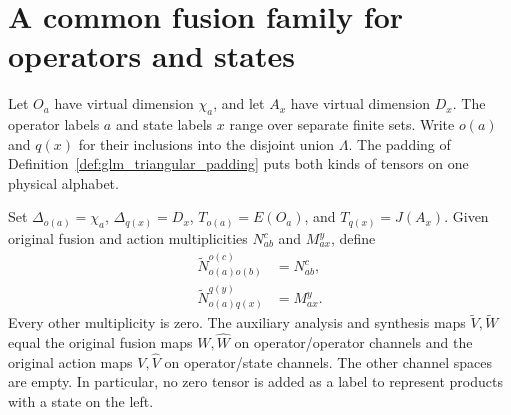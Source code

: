 
\section{A common fusion family for operators and states}
\label{sec:glm_triangular_boundary}

Let $O_a$ have virtual dimension $\chi_a$, and let $A_x$ have virtual
dimension $D_x$. The operator labels $a$ and state labels $x$ range over
separate finite sets. Write $o(a)$ and $q(x)$ for their inclusions into the
disjoint union $\Lambda$. The padding of
Definition~\ref{def:glm_triangular_padding} puts both kinds of tensors on
one physical alphabet.

\begin{definition}
    \leanok
    \label{def:glm_triangular_boundary_family}
    Set $\Delta_{o(a)}=\chi_a$, $\Delta_{q(x)}=D_x$,
    $T_{o(a)}=E(O_a)$, and $T_{q(x)}=J(A_x)$.
    Given original fusion and action multiplicities $N_{ab}^c$ and
    $M_{ax}^y$, define
    \begin{align}
        \widetilde N_{o(a)o(b)}^{o(c)} & =N_{ab}^c,
        \label{eq:glm_triangular_fusion_multiplicity} \\
        \widetilde N_{o(a)q(x)}^{q(y)} & =M_{ax}^y.
        \label{eq:glm_triangular_action_multiplicity}
    \end{align}
    Every other multiplicity is zero. The auxiliary analysis and synthesis
    maps $\widetilde V,\widetilde W$ equal the original fusion maps
    $W,\widehat W$ on operator/operator channels and the original action
    maps $V,\widehat V$ on operator/state channels.
    The other channel spaces are empty. In particular, no zero tensor is
    added as a label to represent products with a state on the left.
\end{definition}

